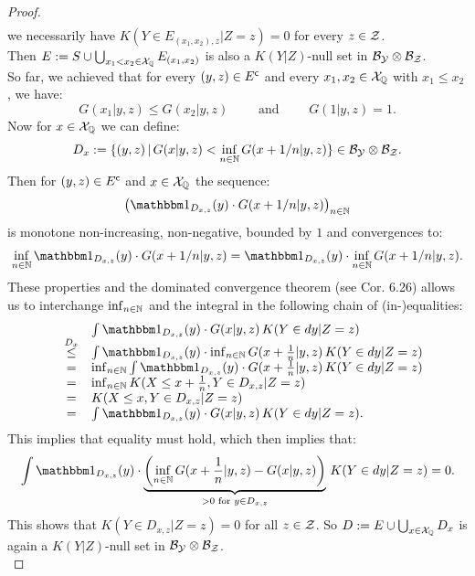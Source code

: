 \begin{Thm}
\begin{proof}
\[\begin{array}{rcl}
\end{array}\]
we necessarily have $ K(Y \in E_{(x_1,x_2),z} |Z=z) = 0$ for every $z \in \mathcal{Z}$.\\
Then $E:= S \cup  \bigcup_{x_1 < x_2 \in \mathcal{X}_{\mathbb{Q}}} E_{(x_1,x_2)}$ is also a $ K(Y|Z)$-null set in $\mathcal{B}_{\mathcal{Y}} \otimes \mathcal{B}_{\mathcal{Z}}$.\\
So far, we achieved that for every $(y,z) \in E^{\mathsf{c}}$ and every $x_1,x_2 \in \mathcal{X}_{\mathbb{Q}}$ with $x_1 \le x_2$, we have:
\[ G(x_1|y,z) \le G(x_2|y,z) \qquad \text{ and } \qquad G(1|y,z)=1. \]
Now for $x \in \mathcal{X}_{\mathbb{Q}}$ we can define: 
\[ D_x := \{ (y,z) \,|\, G(x|y,z) <  \inf_{n \in \mathbb{N}} G(x+1/n|y,z)  \} \in \mathcal{B}_{\mathcal{Y}} \otimes \mathcal{B}_{\mathcal{Z}}.\]
Then for $(y,z) \in E^{\mathsf{c}}$  and $x \in \mathcal{X}_{\mathbb{Q}}$ the sequence:
\[  \lp \I_{D_{x,z}}(y) \cdot G(x+1/n|y,z) \rp_{n \in \N} \]
is monotone non-increasing, non-negative, bounded by $1$ and convergences to:
\[ \inf_{n \in \N} \I_{D_{x,z}}(y) \cdot G(x+1/n|y,z) =  \I_{D_{x,z}}(y) \cdot \inf_{n \in \N} G(x+1/n|y,z). \]
These properties and the dominated convergence theorem (see \cite{Kle20}  Cor. 6.26) allows us to interchange $\inf_{n \in \mathbb{N}}$ and the integral in the following chain of (in-)equalities:
\[ \begin{array}{rcl}
&&  \int \I_{D_{x,z}}(y) \cdot G(x|y,z) \,  K(Y \in dy|Z=z) \\
&\stackrel{D_x}{\le}& \int \I_{D_{x,z}}(y) \cdot \inf_{n \in \N} G(x+\frac{1}{n}|y,z) \,  K(Y \in dy|Z=z) \\
&=& \inf_{n \in \N} \int \I_{D_{x,z}}(y) \cdot G(x+\frac{1}{n}|y,z) \,  K(Y \in dy|Z=z) \\
&=& \inf_{n \in \N}  K(X \le x + \frac{1}{n}, Y \in D_{x,z} |Z=z) \\
&=&   K(X \le x, Y \in D_{x,z} |Z=z) \\
&=& \int \I_{D_{x,z}}(y) \cdot G(x|y,z) \,  K(Y \in dy|Z=z).
\end{array}\]
This implies that equality must hold, which then implies that:
\[
    \int \I_{D_{x,z}}(y) \cdot \underbrace{\lp \inf_{n \in \N} G(x+\frac{1}{n}|y,z) - G(x|y,z) \rp}_{> 0 \text{ for } y \in D_{x,z}} \,  K(Y \in dy|Z=z) =0.
\]
This shows that $ K(Y \in D_{x,z}|Z=z)=0$ for all $z \in \mathcal{Z}$.
So $D:= E \cup \bigcup_{x \in \mathcal{X}_{\mathbb{Q}}} D_x$ is again a $ K(Y|Z)$-null set in $\mathcal{B}_{\mathcal{Y}} \otimes \mathcal{B}_{\mathcal{Z}}$.\\

\end{proof}
\end{Thm}
